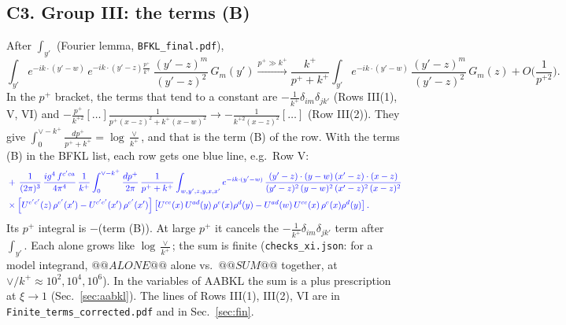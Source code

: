 \documentclass[9pt]{article}
\newcommand{\nc}{\color{blue}}
\numberwithin{equation}{section}
\begin{document}
\subsection*{C3. Group III: the terms (B)}
After $\int_{y'}$ (Fourier lemma, \texttt{BFKL\_final.pdf}),
\begin{equation*}
\int_{y'}e^{-ik\cdot(y'-w)}\,e^{-ik\cdot(y'-z)\frac{p^+}{k^+}}\,\frac{(y'-z)^m}{(y'-z)^2}\,G_m(y')\xrightarrow{p^+\gg k^+}\frac{k^+}{p^++k^+}\int_{y'}e^{-ik\cdot(y'-w)}\,\frac{(y'-z)^m}{(y'-z)^2}\,G_m(z)+O\Big(\frac{1}{p^{+2}}\Big).
\end{equation*}
In the $p^+$ bracket, the terms that tend to a constant are $-\frac{1}{k^+}\delta_{im}\delta_{jk'}$ (Rows III(1), V, VI) and $-\frac{p^+}{k^{+2}}[\dots]\frac{1}{p^+(x-z)^2+k^+(x-w)^2}\to-\frac{1}{k^{+2}(x-z)^2}[\dots]$ (Row III(2)). They give $\int^{\vee-k^+}_0\frac{dp^+}{p^++k^+}=\log\frac{\vee}{k^+}$, and that is the term (B) of the row. With the terms (B) in the BFKL list, each row gets one blue line, e.g.\ Row V:
\begin{align}
&\nc +\,\frac{1}{(2\pi)^{3}}\, \frac{ig^{4}\,f^{c'ca}}{4\pi^{4}}\, \frac{1}{k^{+}}\int_{0}^{\vee-k^{+}} \frac{dp^{+}}{2\pi}\,\frac{1}{p^{+}+k^{+}} \int_{w,y',z,y,x,x'} e^{-ik\cdot (y'-w)}\,\frac{(y'-z)\cdot (y-w)\,(x'-z)\cdot (x-z)}{(y'-z)^{2}\,(y-w)^{2}\,(x'-z)^{2}\,(x-z)^{2}}\notag \\ &\nc \times\left[U^{e'c'}(z)\,\rho^{e'}(x')-U^{c'e'}(x')\,\rho^{e'}(x')\right]\left[U^{ce}(x)\,U^{ad}(y)\,\rho^{e}(x)\rho^{d}(y)-U^{ad}(w)\,U^{ce}(x)\,\rho^{e}(x)\rho^{d}(y)\right].
\end{align}
Its $p^+$ integral is $-$(term (B)). At large $p^+$ it cancels the $-\frac{1}{k^+}\delta_{im}\delta_{jk'}$ term after $\int_{y'}$. Each alone grows like $\log\frac{\vee}{k^+}$; the sum is finite (\texttt{checks\_xi.json}: for a model integrand, $@@ALONE@@$ alone vs.\ $@@SUM@@$ together, at $\vee/k^+\approx10^2,10^4,10^6$). In the variables of AABKL the sum is a plus prescription at $\xi\to1$ (Sec.~\ref{sec:aabkl}). The lines of Rows III(1), III(2), VI are in \texttt{Finite\_terms\_corrected.pdf} and in Sec.~\ref{sec:fin}.
\end{document}
